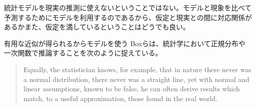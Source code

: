 統計モデルを現実の推測に使えないということではない。モデルと現象を比べて予測するためにモデルを利用するのであるから、仮定と現実との間に対応関係があるかまた、仮定を満しているということはどうでも良い。

\begin{SMbox}{有用な近似が得られるからモデルを使う}
 Boxらは、統計学において正規分布や一次関数で推論することを次のように捉えている\cite{box1976science}。
 \begin{quote}
  Equally, the statistician knows, for example, that in nature there never was a normal distribution, there never was a straight line, yet with normal and linear assumptions, known to be false, he can often derive results which match, to a useful approximation, those found in the real world. 
 \end{quote}
\end{SMbox}



